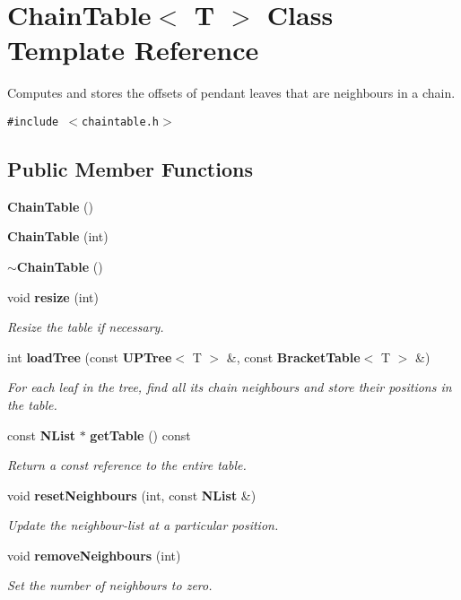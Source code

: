 \section{Chain\-Table$<$ T $>$ Class Template Reference}
\label{classChainTable}
Computes and stores the offsets of pendant leaves that are neighbours in a chain.  


{\tt \#include $<$chaintable.h$>$}

\subsection*{Public Member Functions}
\begin{CompactItemize}
\item 
{\bf Chain\-Table} ()
\item 
{\bf Chain\-Table} (int)
\item 
{\bf $\sim$Chain\-Table} ()
\item 
void {\bf resize} (int)
\begin{CompactList}\small\item\em Resize the table if necessary. \item\end{CompactList}\item 
int {\bf load\-Tree} (const {\bf UPTree}$<$ T $>$ \&, const {\bf Bracket\-Table}$<$ T $>$ \&)
\begin{CompactList}\small\item\em For each leaf in the tree, find all its chain neighbours and store their positions in the table. \item\end{CompactList}\item 
const {\bf NList} $\ast$ {\bf get\-Table} () const 
\begin{CompactList}\small\item\em Return a const reference to the entire table. \item\end{CompactList}\item 
void {\bf reset\-Neighbours} (int, const {\bf NList} \&)
\begin{CompactList}\small\item\em Update the neighbour-list at a particular position. \item\end{CompactList}\item 
void {\bf remove\-Neighbours} (int)
\begin{CompactList}\small\item\em Set the number of neighbours to zero. \item\end{CompactList}\item 

\end{CompactItemize}
